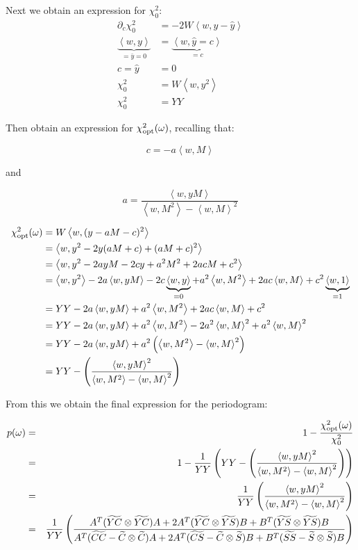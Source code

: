 \documentclass[notitlepage]{article}
\newcommand{\Cc}[1][n]{\widetilde{C}}
\newcommand{\Ss}[1][n]{\widetilde{S}}
\newcommand{\CCc}[1][nm]{\widetilde{CC}}
\newcommand{\SSs}[1][nm]{\widetilde{SS}}
\newcommand{\CS}[1][nm]{\widetilde{CS}}
\newcommand{\YC}[1][n]{\widetilde{YC}}
\newcommand{\YS}[1][n]{\widetilde{YS}}
\newcommand{\Ybar}{\bar{y}}
\newcommand{\YY}{YY}
\newcommand{\iprod}[2]{\left<#1, #2\right>}
\newcommand{\oprod}[2]{#1 \otimes #2}
\begin{document}
Next we obtain an expression for $\chi^2_0$:
\begin{align*}
\partial_c \chi^2_0 &= -2W\iprod{w}{y - \hat{y}}\\
	      \underbrace{\iprod{w}{y}}_{=\Ybar=0} &= \underbrace{\iprod{w}{\hat{y}=c}}_{=c}\\
	        c = \hat{y} &= 0\\
	        \chi^2_0 &= W\iprod{w}{y^2}\\
	        \chi^2_0 &= \YY
\end{align*}

Then obtain an expression for $\chi^2_{\rm opt}(\omega)$, recalling that:

\begin{equation}
c = -a\iprod{w}{M}
\end{equation}

and

\begin{equation}
a = \frac{\iprod{w}{yM}}{\iprod{w}{M^2} - \iprod{w}{M}^2}
\end{equation}

\begin{align*}
\chi^2_{\rm opt}(\omega) &= W\iprod{w}{(y - aM - c)^2}\\
&= \iprod{w}{y^2 - 2y(aM + c) + (aM + c)^2}\\
&= \iprod{w}{y^2 - 2ayM - 2cy + a^2M^2 + 2acM + c^2}\\
&= \iprod{w}{y^2} - 2a\iprod{w}{yM} - 2c\underbrace{\iprod{w}{y}}_{=0} + a^2\iprod{w}{M^2} + 2ac\iprod{w}{M} + c^2\underbrace{\iprod{w}{1}}_{=1}\\
&= \YY - 2a\iprod{w}{yM} + a^2\iprod{w}{M^2} + 2ac\iprod{w}{M} + c^2\\
&= \YY - 2a\iprod{w}{yM} + a^2\iprod{w}{M^2} - 2a^2\iprod{w}{M}^2 + a^2\iprod{w}{M}^2\\
&= \YY - 2a\iprod{w}{yM} + a^2\left(\iprod{w}{M^2} - \iprod{w}{M}^2\right)\\
&= \YY - \left(\frac{\iprod{w}{yM}^2}{\iprod{w}{M^2} - \iprod{w}{M}^2}\right)
\end{align*}

From this we obtain the final expression for the periodogram:

\begin{eqnarray}
p(\omega) &=& 1 - \frac{\chi^2_{\rm opt}(\omega)}{\chi^2_0}\\
		&=& 1 - \frac{1}{\YY}\left(\YY - \left(\frac{\iprod{w}{yM}^2}{\iprod{w}{M^2} - \iprod{w}{M}^2}\right)\right)\\
		&=& \frac{1}{\YY}\left(\frac{\iprod{w}{yM}^2}{\iprod{w}{M^2} - \iprod{w}{M}^2}\right)\\
		&=& \frac{1}{\YY}\left(\frac{ A^T(\oprod{\YC}{\YC})A + 2A^T(\oprod{\YC}{\YS})B + B^T(\oprod{\YS}{\YS})B}{ A^T(\CCc - \oprod{\Cc}{\Cc}) A + 2A^T(\CS - \oprod{\Cc}{\Ss}) B + B^T(\SSs - \oprod{\Ss}{\Ss}) B }\right)
\end{eqnarray}
\end{document}
